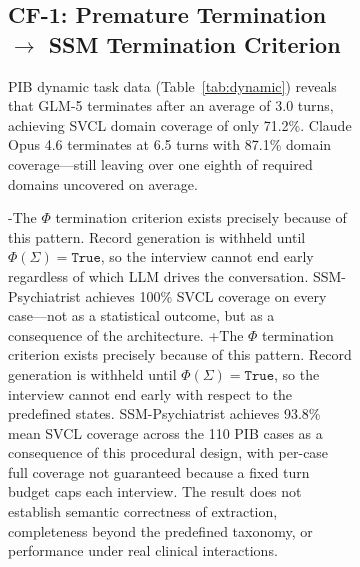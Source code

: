 \begin{figure}[t]
{\begin{figure}[!t]
{ \subsection{CF-1: Premature Termination $\rightarrow$ SSM Termination Criterion}
 
 PIB dynamic task data (Table~\ref{tab:dynamic}) reveals that GLM-5 terminates after an average of 3.0 turns, achieving SVCL domain coverage of only 71.2\%. Claude Opus 4.6 terminates at 6.5 turns with 87.1\% domain coverage---still leaving over one eighth of required domains uncovered on average.
 
-The $\Phi$ termination criterion exists precisely because of this pattern. Record generation is withheld until $\Phi(\Sigma) = \texttt{True}$, so the interview cannot end early regardless of which LLM drives the conversation. SSM-Psychiatrist achieves 100\% SVCL coverage on every case---not as a statistical outcome, but as a consequence of the architecture.
+The $\Phi$ termination criterion exists precisely because of this pattern. Record generation is withheld until $\Phi(\Sigma) = \texttt{True}$, so the interview cannot end early with respect to the predefined states. SSM-Psychiatrist achieves 93.8\% mean SVCL coverage across the 110 PIB cases as a consequence of this procedural design, with per-case full coverage not guaranteed because a fixed turn budget caps each interview. The result does not establish semantic correctness of extraction, completeness beyond the predefined taxonomy, or performance under real clinical interactions.
 
}
\end{figure}}
\end{figure}
